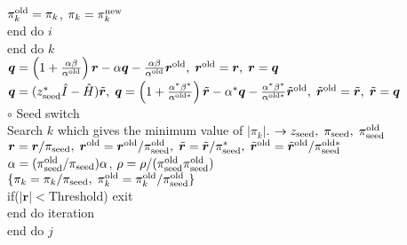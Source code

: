\documentclass[12pt,titlepage]{article}
\begin{document}
\\\hspace{2.0cm}
$\pi_k^{\rm old} = \pi_k$, $\pi_k = \pi_k^{\rm new}$
\\\hspace{1.5cm}
end do $i$
\\\hspace{1.0cm}
end do $k$
\\\hspace{1.0cm}
${\boldsymbol q} = \left( 1 + \frac{\alpha \beta}{\alpha^{\rm old}} \right) {\boldsymbol r}
- \alpha {\boldsymbol q} - \frac{\alpha \beta}{\alpha^{\rm old}} {\boldsymbol r}^{\rm old},\; 
{\boldsymbol r}^{\rm old} = {\boldsymbol r},\; {\boldsymbol r} = {\boldsymbol q}$
\\\hspace{1.0cm}
${\boldsymbol q} = (z_{\rm seed}^* {\hat I} - {\hat H}) {\tilde {\boldsymbol r}},\;
{\boldsymbol q} = \left( 1 + \frac{\alpha^* \beta^*}{\alpha^{{\rm old} *}} \right) {\tilde {\boldsymbol r}}
- \alpha^* {\boldsymbol q} - \frac{\alpha^* \beta^*}{\alpha^{{\rm old} *}} {\tilde {\boldsymbol r}}^{\rm old},\; 
{\tilde {\boldsymbol r}}^{\rm old} = {\tilde {\boldsymbol r}},\; {\tilde {\boldsymbol r}} = {\boldsymbol q}$
\\\hspace{1.0cm}
$\circ$ Seed switch
\\\hspace{1.0cm}
Search $k$ which gives the minimum value of $|\pi_k|$.
$\rightarrow z_{\rm seed},\; \pi_{\rm seed},\; \pi_{\rm seed}^{\rm old} $
\\\hspace{1.0cm}
${\boldsymbol r} = {\boldsymbol r} / \pi_{\rm seed},\; 
{\boldsymbol r}^{\rm old} = {\boldsymbol r}^{\rm old} / \pi_{\rm seed}^{\rm old},\; 
{\tilde {\boldsymbol r}} = {\tilde {\boldsymbol r}} / \pi_{\rm seed}^{ *},\; 
{\tilde {\boldsymbol r}}^{\rm old} = {\tilde {\boldsymbol r}}^{\rm old} / \pi_{\rm seed}^{{\rm old}*}$
\\\hspace{1.0cm}
$\alpha = (\pi_{\rm seed}^{\rm old} / \pi_{\rm seed}) \alpha$,
$\rho = \rho / (\pi_{\rm seed}^{\rm old} \pi_{\rm seed}^{\rm old})$
\\\hspace{1.0cm}
$\{\pi_k = \pi_k / \pi_{\rm seed},\; \pi_k^{\rm old} = \pi_k^{\rm old} / \pi_{\rm seed}^{\rm old}\}$
\\\hspace{1.0cm}
if($|{\boldsymbol r}| < $Threshold) exit
\\\hspace{0.5cm}
end do iteration
\\
end do $j$
\end{document}
